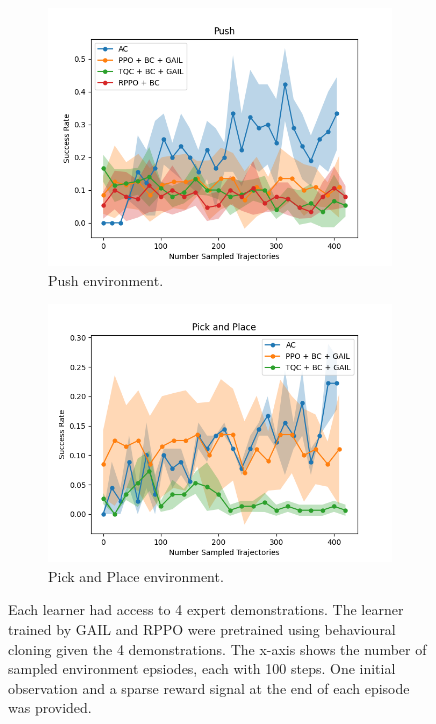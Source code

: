 \begin{figure}[htbp]
\begin{subfigure}[b]{0.45\textwidth}
    \includegraphics[width=\textwidth]{images/4_400/Push.png}
    \caption{Push environment.}
    \label{fig:plot3}
  \end{subfigure}
  \hfill
  \begin{subfigure}[b]{0.45\textwidth}
    \includegraphics[width=\textwidth]{images/4_400/Pick and Place.png}
    \caption{Pick and Place environment.}
    \label{fig:plot4}
  \end{subfigure}
  \caption{Each learner had access to 4 expert demonstrations. 
  The learner trained by GAIL and RPPO were pretrained using behavioural cloning given the 4 demonstrations. 
  The x-axis shows the number of sampled environment epsiodes, each with 100 steps. One initial observation and a sparse reward signal at the end of each episode was provided.}
  \label{fig:4}
\end{figure}